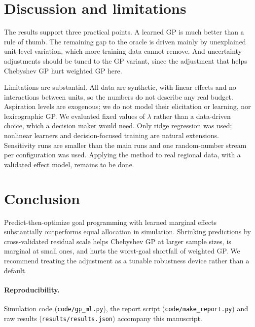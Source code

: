 \documentclass[11pt,a4paper]{article}
\begin{document}
\section{Discussion and limitations}
The results support three practical points. A learned GP is much better than a rule of thumb. The remaining gap to the oracle is driven mainly by unexplained unit-level variation, which more training data cannot remove. And uncertainty adjustments should be tuned to the GP variant, since the adjustment that helps Chebyshev GP hurt weighted GP here.

Limitations are substantial. All data are synthetic, with linear effects and no interactions between units, so the numbers do not describe any real budget. Aspiration levels are exogenous; we do not model their elicitation or learning, nor lexicographic GP. We evaluated fixed values of $\lambda$ rather than a data-driven choice, which a decision maker would need. Only ridge regression was used; nonlinear learners and decision-focused training \citep{elmachtoub2022} are natural extensions. Sensitivity runs are smaller than the main runs and one random-number stream per configuration was used. Applying the method to real regional data, with a validated effect model, remains to be done.

\section{Conclusion}
Predict-then-optimize goal programming with learned marginal effects substantially outperforms equal allocation in simulation. Shrinking predictions by cross-validated residual scale helps Chebyshev GP at larger sample sizes, is marginal at small ones, and hurts the worst-goal shortfall of weighted GP. We recommend treating the adjustment as a tunable robustness device rather than a default.

\paragraph{Reproducibility.} Simulation code (\texttt{code/gp\_ml.py}), the report script (\texttt{code/make\_report.py}) and raw results (\texttt{results/results.json}) accompany this manuscript.



\end{document}
